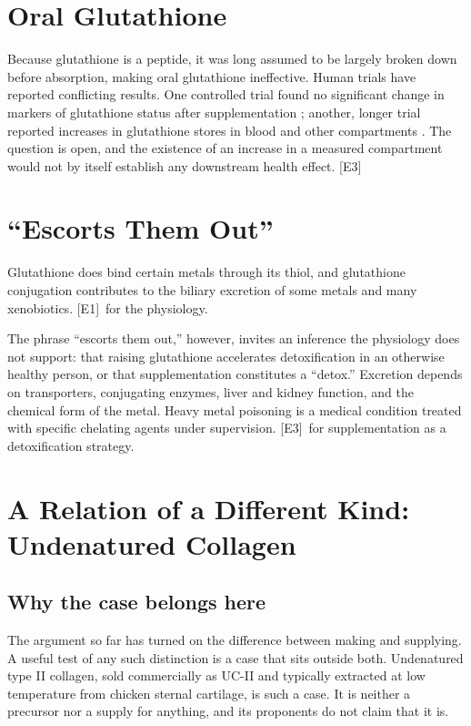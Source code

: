 \documentclass[11pt,a4paper]{article}
\theoremstyle{plain}
\theoremstyle{definition}
\theoremstyle{remark}
\newcommand{\tier}[1]{\textup{\textsc{[#1]}}}
\newcommand{\Eone}{\tier{E1}}
\newcommand{\Ethree}{\tier{E3}}
\begin{document}
\section{Oral Glutathione}

Because glutathione is a peptide, it was long assumed to be largely broken down before absorption, making oral glutathione ineffective. Human trials have reported conflicting results. One controlled trial found no significant change in markers of glutathione status after supplementation \cite{allen2011}; another, longer trial reported increases in glutathione stores in blood and other compartments \cite{richie2015}. The question is open, and the existence of an increase in a measured compartment would not by itself establish any downstream health effect. \Ethree

\section{``Escorts Them Out''}

Glutathione does bind certain metals through its thiol, and glutathione conjugation contributes to the biliary excretion of some metals and many xenobiotics. \Eone\ for the physiology.

The phrase ``escorts them out,'' however, invites an inference the physiology does not support: that raising glutathione accelerates detoxification in an otherwise healthy person, or that supplementation constitutes a ``detox.'' Excretion depends on transporters, conjugating enzymes, liver and kidney function, and the chemical form of the metal. Heavy metal poisoning is a medical condition treated with specific chelating agents under supervision. \Ethree\ for supplementation as a detoxification strategy.

\section{A Relation of a Different Kind: Undenatured Collagen}\label{sec:ucii}

\subsection{Why the case belongs here}

The argument so far has turned on the difference between making and supplying. A useful test of any such distinction is a case that sits outside both. Undenatured type II collagen, sold commercially as UC-II and typically extracted at low temperature from chicken sternal cartilage, is such a case. It is neither a precursor nor a supply for anything, and its proponents do not claim that it is.
\end{document}
